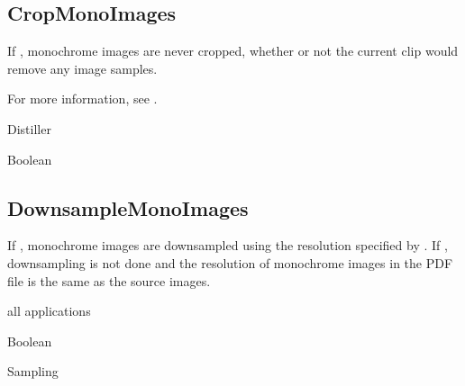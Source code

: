 \documentclass[letterpaper,12pt,english,openany,oneside]{sphinxmanual}
\begin{document}
\subsection{CropMonoImages}
\label{\detokenize{PDF_Create_CommonSettings:cropmonoimages}}
If  , monochrome images are never cropped, whether or not the current clip would remove any image samples.

For more information, see .

\label{\detokenize{PDF_Create_CommonSettings:supported-by-55}}

Distiller

\label{\detokenize{PDF_Create_CommonSettings:type-55}}

Boolean

\label{\detokenize{PDF_Create_CommonSettings:default-value-51}}

\begin{sphinxVerbatim}[commandchars=\\\{\}]
\end{sphinxVerbatim}




\subsection{DownsampleMonoImages}
\label{\detokenize{PDF_Create_CommonSettings:downsamplemonoimages}}
If  , monochrome images are downsampled using the resolution specified by  . If  , downsampling is not done and the resolution of monochrome images in the PDF file is the same as the source images.

\label{\detokenize{PDF_Create_CommonSettings:supported-by-56}}

all applications

\label{\detokenize{PDF_Create_CommonSettings:type-56}}

Boolean

\label{\detokenize{PDF_Create_CommonSettings:ui-name-42}}

Sampling
\end{document}
